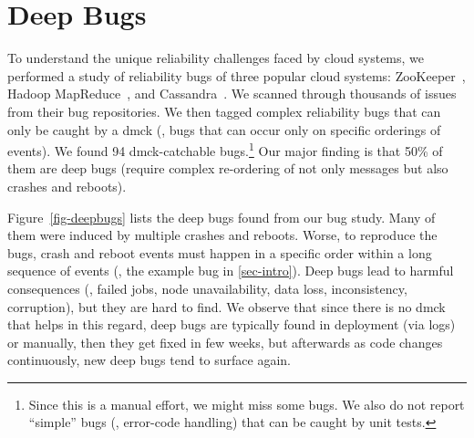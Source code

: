 

\section{Deep Bugs}
\label{mot-deep}


\fi



To understand the unique reliability challenges faced by cloud
systems, we performed a study of reliability bugs of three popular
cloud systems: ZooKeeper~\cite{Hunt+10-ZooKeeperPaper}, Hadoop
MapReduce~\cite{Kumar+13-Yarn}, and
Cassandra~\cite{Lakshman+09-Cassandra}.  We scanned through thousands
of issues from their bug repositories.  We then tagged complex
reliability bugs that can only be caught by a dmck (\ie, bugs that can
occur only on specific orderings of events).  We found 94
dmck-catchable bugs.\footnote[1]{Since this is a manual effort, we
  might miss some bugs.  We also do not report ``simple'' bugs (\eg,
  error-code handling) that can be caught by unit tests.}  Our major
finding is that 50\% of them are deep bugs (require complex
re-ordering of not only messages but also crashes and reboots).



Figure~\ref{fig-deepbugs} lists the deep bugs found from our bug
study.  Many of them were induced by multiple crashes and reboots.
Worse, to reproduce the bugs, crash and reboot events must happen in a
specific order within a long sequence of events (\eg, the example bug
in \sec\ref{sec-intro}).  Deep bugs lead to harmful consequences (\eg,
failed jobs, node unavailability, data loss, inconsistency,
corruption), but they are hard to find.  We observe that since there
is no dmck that helps in this regard, deep bugs are typically found in
deployment (via logs) or manually, then they get fixed in few
weeks, but afterwards as code changes continuously, new deep bugs
tend to surface again.

